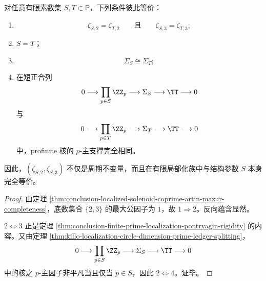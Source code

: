 \begin{corollary}\label{cor:conclusion-localized-solenoid-two-coprime-zeta-structure-equivalence}
对任意有限素数集 \(S,T\subset \mathbb P\)，下列条件彼此等价：
\begin{enumerate}
\item
\[
\zeta_{S,2}=\zeta_{T,2}
\qquad\text{且}\qquad
\zeta_{S,3}=\zeta_{T,3};
\]
\item \(S=T\)；
\item
\[
\Sigma_S\cong \Sigma_T;
\]
\item 在短正合列
\[
0\longrightarrow \prod_{p\in S}\ZZ_p\longrightarrow \Sigma_S\longrightarrow \TT\longrightarrow 0
\]
与
\[
0\longrightarrow \prod_{p\in T}\ZZ_p\longrightarrow \Sigma_T\longrightarrow \TT\longrightarrow 0
\]
中，profinite 核的 \(p\)-主支撑完全相同。
\end{enumerate}
因此，\((\zeta_{S,2},\zeta_{S,3})\) 不仅是周期不变量，而且在有限局部化族中与结构参数 \(S\) 本身完全等价。
\end{corollary}
\begin{proof}
由定理 \ref{thm:conclusion-localized-solenoid-coprime-artin-mazur-completeness}，底数集合 \(\{2,3\}\) 的最大公因子为 \(1\)，故 \(1\Rightarrow 2\)。反向蕴含显然。

\(2\Leftrightarrow 3\) 正是定理 \ref{thm:conclusion-finite-prime-localization-pontryagin-rigidity} 的内容。又由定理 \ref{thm:killo-localization-circle-dimension-prime-ledger-splitting}，
\[
0\longrightarrow \prod_{p\in S}\ZZ_p\longrightarrow \Sigma_S\longrightarrow \TT\longrightarrow 0
\]
中的核之 \(p\)-主因子非平凡当且仅当 \(p\in S\)，因此 \(2\Leftrightarrow 4\)。证毕。
\end{proof}

